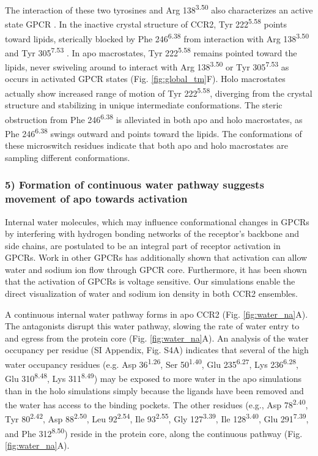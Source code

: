 \documentclass[9pt,twocolumn,twoside]{pnas-new}
\begin{document}
The interaction of these two tyrosines and Arg 138\textsuperscript{3.50} also characterizes an active state GPCR \cite{Caliman2015}.
In the inactive crystal structure of CCR2, Tyr 222\textsuperscript{5.58} points toward lipids, sterically blocked by Phe 246\textsuperscript{6.38} from interaction with Arg 138\textsuperscript{3.50} and Tyr 305\textsuperscript{7.53} \cite{Zheng2016}.
In apo macrostates, Tyr 222\textsuperscript{5.58} remains pointed toward the lipids, never swiveling around to interact with Arg 138\textsuperscript{3.50} or Tyr 305\textsuperscript{7.53} as occurs in activated GPCR states (Fig. \ref{fig:global_tm}F).
Holo macrostates actually show increased range of motion of Tyr 222\textsuperscript{5.58}, diverging from the crystal structure and stabilizing in unique intermediate conformations.
The steric obstruction from Phe 246\textsuperscript{6.38} is alleviated in both apo and holo macrostates, as Phe 246\textsuperscript{6.38} swings outward and points toward the lipids.
The conformations of these microswitch residues indicate that both apo and holo macrostates are sampling different conformations.


\subsubsection*{\textbf{5) Formation of continuous water pathway suggests movement of apo towards activation}}
Internal water molecules, which may influence conformational changes in GPCRs by interfering with hydrogen bonding networks of the receptor's backbone and side chains, are postulated to be an integral part of receptor activation in GPCRs\cite{Jastrzebska2011, Angel2009,Choe2011, Huang2015}.
Work in other GPCRs has additionally shown that activation can allow water and sodium ion flow through GPCR core\cite{Yuan2014}.
Furthermore, it has been shown that the activation of GPCRs is voltage sensitive\cite{Rinne2013}.
Our simulations enable the direct visualization of water and sodium ion density in both CCR2 ensembles.

A continuous internal water pathway forms in apo CCR2 (Fig. \ref{fig:water_na}A).
The antagonists disrupt this water pathway, slowing the rate of water entry to and egress from the protein core (Fig. \ref{fig:water_na}A).
An analysis of the water occupancy per residue (SI Appendix, Fig. S4A) indicates that several of the high water occupancy residues (e.g. Asp 36\textsuperscript{1.26}, Ser 50\textsuperscript{1.40}, Glu 235\textsuperscript{6.27}, Lys 236\textsuperscript{6.28}, Glu 310\textsuperscript{8.48}, Lys 311\textsuperscript{8.49}) may be exposed to more water in the apo simulations than in the holo simulations simply because the ligands have been removed and the water has access to the binding pockets.
The other residues (e.g., Asp 78\textsuperscript{2.40}, Tyr 80\textsuperscript{2.42}, Asp 88\textsuperscript{2.50}, Leu 92\textsuperscript{2.54}, Ile 93\textsuperscript{2.55}, Gly 127\textsuperscript{3.39}, Ile 128\textsuperscript{3.40}, Glu 291\textsuperscript{7.39}, and Phe 312\textsuperscript{8.50}) reside in the protein core, along the continuous pathway (Fig. \ref{fig:water_na}A).
\end{document}
